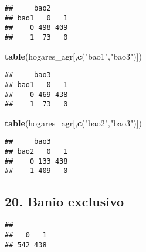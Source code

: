 \documentclass[11pt,]{article}
\newenvironment{Shaded}{\begin{snugshade}}{\end{snugshade}}
\newcommand{\KeywordTok}[1]{\textcolor[rgb]{0.13,0.29,0.53}{\textbf{#1}}}
\newcommand{\DecValTok}[1]{\textcolor[rgb]{0.00,0.00,0.81}{#1}}
\newcommand{\StringTok}[1]{\textcolor[rgb]{0.31,0.60,0.02}{#1}}
\newcommand{\CommentTok}[1]{\textcolor[rgb]{0.56,0.35,0.01}{\textit{#1}}}
\newcommand{\OperatorTok}[1]{\textcolor[rgb]{0.81,0.36,0.00}{\textbf{#1}}}
\newcommand{\NormalTok}[1]{#1}
\begin{document}
\begin{verbatim}
##     bao2
## bao1   0   1
##    0 498 409
##    1  73   0
\end{verbatim}

\begin{Shaded}
\begin{Highlighting}[]
\KeywordTok{table}\NormalTok{(hogares_agr[,}\KeywordTok{c}\NormalTok{(}\StringTok{"bao1"}\NormalTok{,}\StringTok{"bao3"}\NormalTok{)])}
\end{Highlighting}
\end{Shaded}

\begin{verbatim}
##     bao3
## bao1   0   1
##    0 469 438
##    1  73   0
\end{verbatim}

\begin{Shaded}
\begin{Highlighting}[]
\KeywordTok{table}\NormalTok{(hogares_agr[,}\KeywordTok{c}\NormalTok{(}\StringTok{"bao2"}\NormalTok{,}\StringTok{"bao3"}\NormalTok{)])}
\end{Highlighting}
\end{Shaded}

\begin{verbatim}
##     bao3
## bao2   0   1
##    0 133 438
##    1 409   0
\end{verbatim}

\subsection{20. Banio exclusivo}\label{banio-exclusivo}

\begin{Shaded}
\end{Shaded}

\begin{verbatim}
## 
##   0   1 
## 542 438
\end{verbatim}
\end{document}
